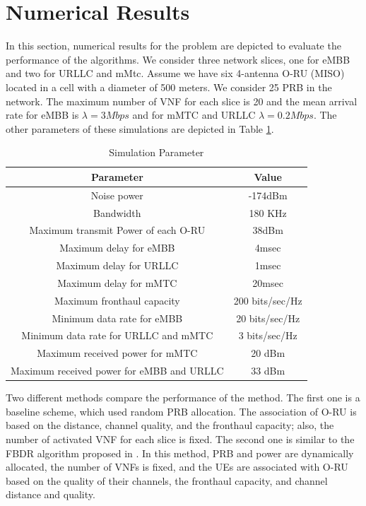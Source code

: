 \documentclass[conference]{IEEEtran}
\begin{document}
\section{Numerical Results}\label{NE}
In this section, numerical results for the problem are depicted to evaluate the performance of the algorithms. We consider three network slices, one for eMBB and two for URLLC and mMtc.
Assume we have six 4-antenna O-RU (MISO) located in a cell with a diameter of 500 meters. We consider 25 PRB in the network.
The maximum number of VNF for each slice is 20 and the mean arrival rate for eMBB  is $\lambda  = 3Mbps$ and for mMTC and URLLC $\lambda  = 0.2Mbps$. 
The other parameters of these simulations are depicted in Table \ref{table:1a}.
\begin{table}
 \caption {Simulation Parameter} \label{table:1a}
 \begin{center}
  \begin{tabular}{||c c ||}
  \hline
Parameter & Value \\ [0.5ex]
  \hline\hline
  Noise power & -174dBm\\
  \hline
  Bandwidth & 180 KHz \\
  \hline
 Maximum transmit Power of each O-RU & 38dBm \\
  \hline
  Maximum delay for eMBB &  4msec \\
  \hline
    Maximum delay for URLLC &  1msec \\
  \hline
  Maximum delay for mMTC &  20msec \\
  \hline
  Maximum fronthaul capacity  & 200 bits/sec/Hz \\
   \hline
  Minimum data rate for eMBB &  20 bits/sec/Hz \\ 
  \hline
   Minimum data rate for URLLC and mMTC &  3 bits/sec/Hz \\ 
  \hline
   Maximum received power for mMTC &  20 dBm \\ [.5ex]   
  \hline
    Maximum received power for eMBB and URLLC &  33 dBm \\ [.5ex]   
  \hline
 \end{tabular}
 \end{center}
 \end{table}
Two different methods compare the performance of the method.
 The first one is a baseline scheme, which used random PRB allocation. The association of O-RU is based on the distance, channel quality, and the fronthaul capacity; also, the number of activated VNF for each slice is fixed. 
The second one is similar to the FBDR algorithm proposed in \cite{lee2018dynamic}. In this method, PRB and power are dynamically allocated, the number of VNFs is fixed, and the UEs are associated with O-RU based on the quality of their channels, the fronthaul capacity, and channel distance and quality.
\end{document}

